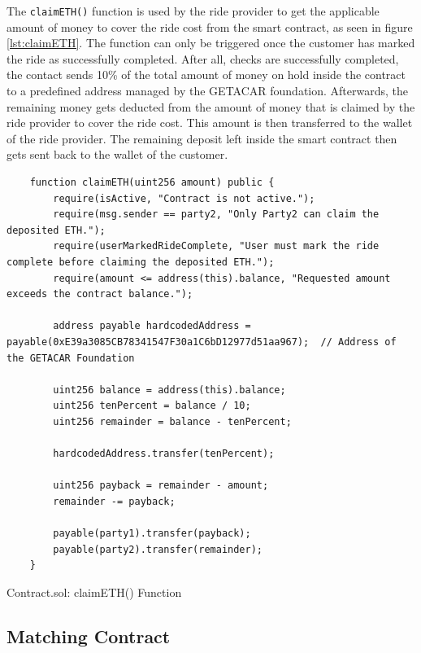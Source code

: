 The \texttt{claimETH()} function is used by the ride provider to get the applicable amount of money to cover the ride cost from the smart contract, as seen in figure \ref{lst:claimETH}. The function can only be triggered once the customer has marked the ride as successfully completed. After all, checks are successfully completed, the contact sends 10\% of the total amount of money on hold inside the contract to a predefined address managed by the GETACAR foundation. Afterwards, the remaining money gets deducted from the amount of money that is claimed by the ride provider to cover the ride cost. This amount is then transferred to the wallet of the ride provider. The remaining deposit left inside the smart contract then gets sent back to the wallet of the customer. 

\lstset{
  basicstyle=\footnotesize\ttfamily,
  breaklines=true,
  numbers=left,
  firstnumber=232
}

\begin{Listing}
\begin{lstlisting}
    function claimETH(uint256 amount) public {
        require(isActive, "Contract is not active.");
        require(msg.sender == party2, "Only Party2 can claim the deposited ETH.");
        require(userMarkedRideComplete, "User must mark the ride complete before claiming the deposited ETH.");
        require(amount <= address(this).balance, "Requested amount exceeds the contract balance.");
        
        address payable hardcodedAddress = payable(0xE39a3085CB78341547F30a1C6bD12977d51aa967);  // Address of the GETACAR Foundation

        uint256 balance = address(this).balance;
        uint256 tenPercent = balance / 10;
        uint256 remainder = balance - tenPercent;

        hardcodedAddress.transfer(tenPercent);

        uint256 payback = remainder - amount;
        remainder -= payback;

        payable(party1).transfer(payback);
        payable(party2).transfer(remainder);
    }
\end{lstlisting}
  \caption{Contract.sol: claimETH() Function}
  \label{lst:claimETH}
\end{Listing}


\subsection{Matching Contract}

